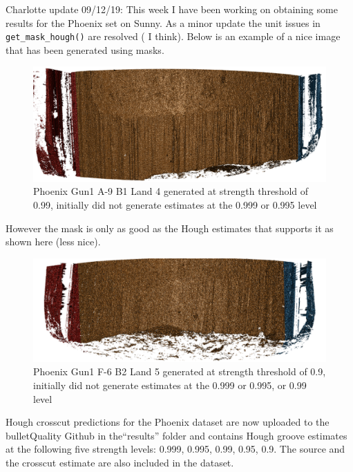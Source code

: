 \documentclass[]{book}
\begin{document}
Charlotte update 09/12/19:
This week I have been working on obtaining some results for the Phoenix set on Sunny.
As a minor update the unit issues in \texttt{get\_mask\_hough()} are resolved ( I think). Below
is an example of a nice image that has been generated using masks.

\begin{figure}

{\centering \includegraphics[width=21.53in]{images/bullets/Hough_project/mask_phoenix_nice} 

}

\caption{ Phoenix Gun1 A-9 B1 Land 4 generated at strength threshold of 0.99, initially did not generate estimates at the 0.999 or 0.995 level}\label{fig:unnamed-chunk-11}
\end{figure}

However the mask is only as good as the Hough estimates that supports it as shown here (less nice).

\begin{figure}

{\centering \includegraphics[width=17.03in]{images/bullets/Hough_project/mask_phonix_lessnice} 

}

\caption{ Phoenix Gun1 F-6 B2 Land 5 generated at strength threshold of 0.9, initially did not generate estimates at the 0.999 or 0.995, or 0.99 level}\label{fig:unnamed-chunk-12}
\end{figure}

Hough crosscut predictions for the Phoenix dataset are now uploaded to the bulletQuality Github in the``results'' folder and contains Hough groove estimates at the following five strength levels: 0.999, 0.995, 0.99, 0.95, 0.9. The source and the crosscut estimate are also included in the dataset.
\end{document}
